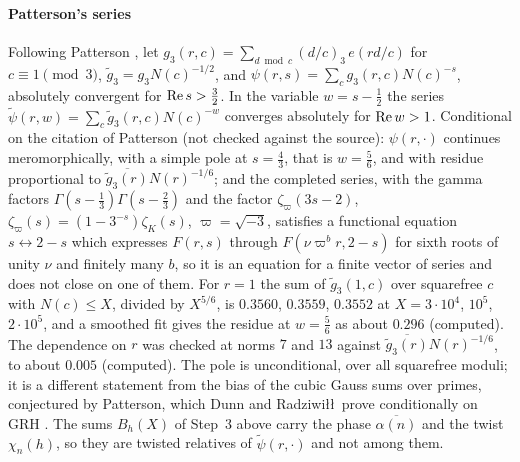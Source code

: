 \paragraph{Patterson's series} Following Patterson \cite{NCPatterson77}, let $g_3(r,c)=\sum_{d\bmod c}(d/c)_3\,e(rd/c)$ for $c\equiv1\pmod3$, $\tilde g_3=g_3N(c)^{-1/2}$, and $\psi(r,s)=\sum_cg_3(r,c)N(c)^{-s}$, absolutely convergent for $\operatorname{Re} s>\frac32$. In the variable $w=s-\frac12$ the series $\tilde\psi(r,w)=\sum_c\tilde g_3(r,c)N(c)^{-w}$ converges absolutely for $\operatorname{Re} w>1$. Conditional on the citation of Patterson (not checked against the source): $\psi(r,\cdot)$ continues meromorphically, with a simple pole at $s=\frac43$, that is $w=\frac56$, and with residue proportional to $\overline{\tilde g_3(r)}N(r)^{-1/6}$; and the completed series, with the gamma factors $\Gamma(s-\frac13)\Gamma(s-\frac23)$ and the factor $\zeta_\varpi(3s-2)$, $\zeta_\varpi(s)=(1-3^{-s})\zeta_K(s)$, $\varpi=\sqrt{-3}$, satisfies a functional equation $s\leftrightarrow2-s$ which expresses $F(r,s)$ through $F(\nu\varpi^br,2-s)$ for sixth roots of unity $\nu$ and finitely many $b$, so it is an equation for a finite vector of series and does not close on one of them. For $r=1$ the sum of $\tilde g_3(1,c)$ over squarefree $c$ with $N(c)\le X$, divided by $X^{5/6}$, is $0.3560$, $0.3559$, $0.3552$ at $X=3\cdot10^4$, $10^5$, $2\cdot10^5$, and a smoothed fit gives the residue at $w=\frac56$ as about $0.296$ (computed). The dependence on $r$ was checked at norms $7$ and $13$ against $\overline{\tilde g_3(r)}N(r)^{-1/6}$, to about $0.005$ (computed). The pole is unconditional, over all squarefree moduli; it is a different statement from the bias of the cubic Gauss sums over primes, conjectured by Patterson, which Dunn and Radziwi\l\l\ prove conditionally on GRH \cite{NCDunnRadziwill24}. %
The sums $B_h(X)$ of Step~3 above carry the phase $\overline{\alpha(n)}$ and the twist $\chi_n(h)$, so they are twisted relatives of $\tilde\psi(r,\cdot)$ and not among them.

